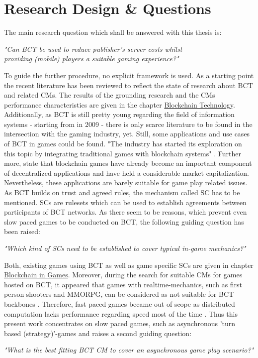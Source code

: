 \FloatBarrier

\section{Research Design \& Questions}
\label{sec:ResearchDesignQuestions}

The main research question which shall be answered with this thesis is:
\begin{center}
	\textit{"Can \gls{BCT} be used to reduce publisher's server costs whilst \\
		providing (mobile) players a suitable gaming experience?"}
\end{center}
To guide the further procedure, no explicit framework is used.
As a starting point the recent literature has been reviewed to reflect the state of research about \gls{BCT} and related \gls{CM}s.
The results of the grounding research and the \gls{CM}s performance characteristics are given in the chapter \hyperref[chap:BCT]{Blockchain Technology}.
Additionally, as \gls{BCT} is still pretty young regarding the field of information systems - starting from \cite{Nakamoto.2009} in 2009 -
there is only scarce literature to be found in the intersection with the gaming industry, yet.
Still, some applications and use cases of \gls{BCT} in games could be found.
"The industry has started its exploration on this topic by integrating traditional games with blockchain systems" \cite[1]{Min.2019b}.
Further more, \citet[1]{Min.2019b} state that blockchain games have already become an important component of decentralized applications and have held a considerable market capitalization.
Nevertheless, these applications are barely suitable for game play related issues.\\
As \gls{BCT} builds on trust and agreed rules, the mechanism called \gls{SC} has to be mentioned.
\gls{SC}s are rulesets which can be used to establish agreements between participants of \gls{BCT} networks.
As there seem to be reasons, which prevent even slow paced games to be conducted on \gls{BCT}, the following guiding question has been raised:
\begin{center}
	\textit{"Which kind of \gls{SC}s need to be established to cover typical in-game mechanics?"}
\end{center}
Both, existing games using \gls{BCT} as well as game specific \gls{SC}s are given in chapter \hyperref[chap:BlockchainInGames]{Blockchain in Games}.
Moreover, during the search for suitable \gls{CM}s for games hosted on \gls{BCT},
it appeared that games with realtime-mechanics, such as first person shooters and \gls{MMORPG},
can be considered as not suitable for \gls{BCT} backbones \cite[19]{Serada.2020}.
Therefore, fast paced games became out of scope as distributed computation lacks performance regarding speed most of the time \cite[3]{Serada.2020}.
Thus this present work concentrates on slow paced games, such as asynchronous 'turn based (strategy)'-games \cite[1]{Bergsma.2008} and raises a second guiding question:
\begin{center}
	\textit{"What is the best fitting \gls{BCT} \gls{CM} to cover an asynchronous game play scenario?"}
\end{center}

